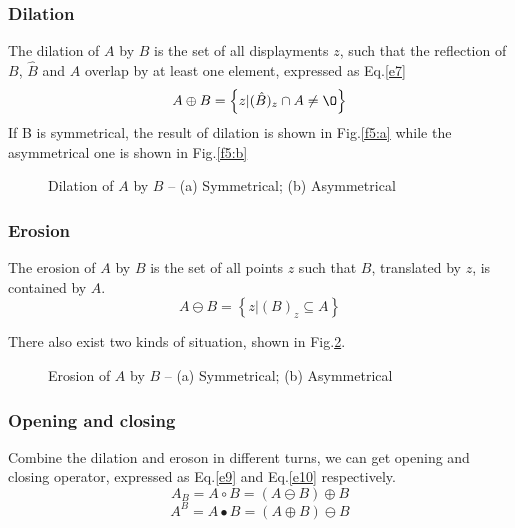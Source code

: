 \documentclass[journal]{IEEEtran}
\begin{document}
\subsubsection{Dilation}
The dilation of $ A $ by $ B $ is the set of all displayments $ z $, such that the reflection of $ B $, $ \hat{B} $ and $ A $ overlap by at least one element, expressed as Eq.\ref{e7}
\begin{equation}\label{e7}
A \oplus B = \left\{ z | (\hat{B})_{z} \cap  A \neq \O \right\}
\end{equation}
If B is symmetrical, the result of dilation is shown in Fig.\ref{f5:a} while the asymmetrical one is shown in Fig.\ref{f5:b}
\begin{figure}[h]
\centering
{}
\hspace{1in}
\caption{Dilation of $A$ by $B$ -- (a) Symmetrical; (b) Asymmetrical}
\label{f5}
\end{figure}

\subsubsection{Erosion}
The erosion of $ A $ by $ B $ is the set of all points $ z $ such that $ B $, translated by $ z $, is contained by $ A $.
\begin{equation}\label{e8}
A \ominus B = \left\{ z | (B)_{z} \subseteq   A\right\}
\end{equation}

There also exist two kinds of situation, shown in Fig.\ref{f6}.

\begin{figure}[h]
\centering
{}
\hspace{1in}
\caption{Erosion of $A$ by $B$ -- (a) Symmetrical; (b) Asymmetrical}
\label{f6}
\end{figure}

\subsubsection{Opening and closing}
Combine the dilation and eroson in different turns, we can get opening and closing operator, expressed as Eq.\ref{e9} and Eq.\ref{e10} respectively.
\begin{equation}\label{e9}
A_{B}=A \circ B=(A\ominus B)\oplus B
\end{equation}
\begin{equation}\label{e10}
A^{B}=A\bullet  B=(A\oplus B)\ominus B
\end{equation}
\end{document}
